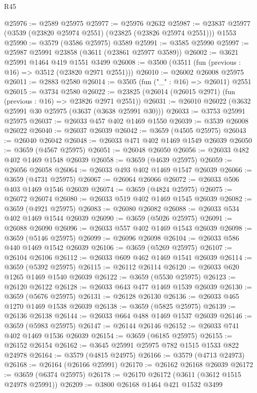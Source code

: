\begin{lexlean}{R45}
\begin{coremodule}
@25976 := @2589 @25975
@25977 := @25976 @2632
@25987 := @23837 @25977 (@3539 (@23820 @25974 @2551) (@23825 (@23826 @25974 @2551))) @1553
@25990 := @3579 (@3586 @25975) @3589
@25991 := @3585 @25990
@25997 := @25987 @25991 @23858 (@3611 (@23861 @25977 @3589))
@26002 := @3621 @25991 @1464 @419 @1551 @3499
@26008 := @3500 (@3511 (fun (previous : @16) => @3512 (@23820 @2971 @2551)))
@26010 := @26002 @26008 @25975
@26011 := @2883 @2580
@26014 := @3505 (fun ("_" : @16) => @26011) @2551
@26015 := @3734 @2580
@26022 := @23825 (@26014 (@26015 @2971) (fun (previous : @16) => @23826 @2971 @2551))
@26031 := @26010 @26022 (@3632 @25991 @30 @25975 (@3637 (@3638 @25991 @30)))
@26033 := @3753 @25991 @25975
@26037 := @26033 @457 @402 @1469 @1550
@26039 := @3539 @26008 @26022
@26040 := @26037 @26039
@26042 := @3659 (@4505 @25975)
@26043 := @26040 @26042
@26048 := @26033 @471 @402 @1469 @1549 @26039
@26050 := @3659 (@4567 @25975)
@26051 := @26048 @26050
@26056 := @26033 @482 @402 @1469 @1548 @26039
@26058 := @3659 (@4639 @25975)
@26059 := @26056 @26058
@26064 := @26033 @493 @402 @1469 @1547 @26039
@26066 := @3659 (@4731 @25975)
@26067 := @26064 @26066
@26072 := @26033 @506 @403 @1469 @1546 @26039
@26074 := @3659 (@4824 @25975)
@26075 := @26072 @26074
@26080 := @26033 @519 @402 @1469 @1545 @26039
@26082 := @3659 (@4921 @25975)
@26083 := @26080 @26082
@26088 := @26033 @534 @402 @1469 @1544 @26039
@26090 := @3659 (@5026 @25975)
@26091 := @26088 @26090
@26096 := @26033 @557 @402 @1469 @1543 @26039
@26098 := @3659 (@5146 @25975)
@26099 := @26096 @26098
@26104 := @26033 @586 @440 @1469 @1542 @26039
@26106 := @3659 (@5269 @25975)
@26107 := @26104 @26106
@26112 := @26033 @609 @462 @1469 @1541 @26039
@26114 := @3659 (@5392 @25975)
@26115 := @26112 @26114
@26120 := @26033 @620 @1265 @1469 @1540 @26039
@26122 := @3659 (@5530 @25975)
@26123 := @26120 @26122
@26128 := @26033 @643 @477 @1469 @1539 @26039
@26130 := @3659 (@5676 @25975)
@26131 := @26128 @26130
@26136 := @26033 @465 @1270 @1469 @1538 @26039
@26138 := @3659 (@5825 @25975)
@26139 := @26136 @26138
@26144 := @26033 @664 @488 @1469 @1537 @26039
@26146 := @3659 (@5983 @25975)
@26147 := @26144 @26146
@26152 := @26033 @741 @402 @1469 @1536 @26039
@26154 := @3659 (@6185 @25975)
@26155 := @26152 @26154
@26162 := @3645 @25991 @25975 @782 @1515 @1533 @822 @24978
@26164 := @3579 (@4815 @24975)
@26166 := @3579 (@4713 @24973)
@26168 := @26164 (@26166 @25991)
@26170 := @26162 @26168 @26039
@26172 := @3659 (@6374 @25975)
@26178 := @26170 @26172 (@3611 (@3612 @1515 @24978 @25991))
@26209 := @3800
    @26168
    @1464
    @421
    @1532
    @3499

\end{coremodule}
\end{lexlean}
